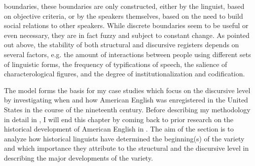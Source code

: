 boundaries, these boundaries are only constructed, either by the linguist, based on objective criteria, or by the speakers themselves, based on the need to build social relations to other speakers. While discrete boundaries seem to be useful or even necessary, they are in fact fuzzy and subject to constant change. As pointed out above, the stability of both structural and discursive registers depends on several factors, e.g. the amount of interactions between people using different sets of linguistic forms, the frequency of typifications of speech, the salience of characterological figures, and the degree of institutionalization and codification.


The model forms the basis for my case studies which focus on the discursive level by investigating when and how American English was enregistered in the United States in the course of the nineteenth century. Before describing my methodology in detail in , I will end this chapter by coming back to prior research on the historical development of American English in . The aim of the section is to analyze how historical linguists have determined the beginning(s) of the variety and which importance they attribute to the structural and the discursive level in describing the major developments of the variety.

